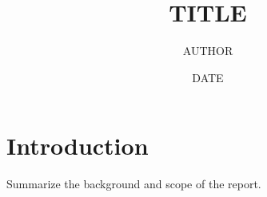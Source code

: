 \documentclass[11pt]{report}
\title{{{TITLE}}}
\author{{{AUTHOR}}}
\date{{{DATE}}}
\begin{document}
\maketitle
\tableofcontents

\chapter{Introduction}
\label{chap:introduction}

Summarize the background and scope of the report.


\end{document}
